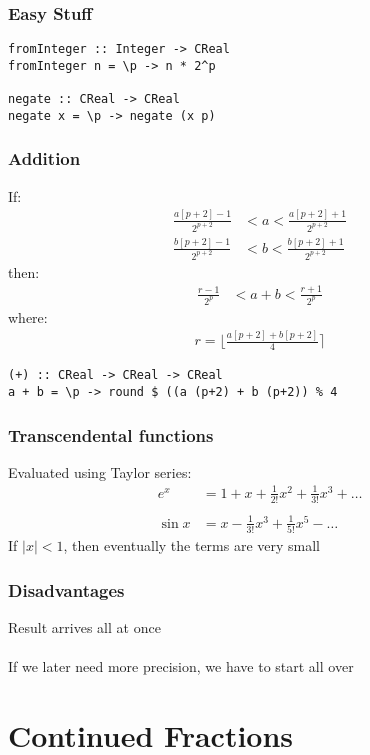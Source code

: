 \documentclass[11pt]{beamer}
\begin{document}
\begin{frame}[fragile]
\frametitle{Easy Stuff}
\begin{verbatim}
fromInteger :: Integer -> CReal
fromInteger n = \p -> n * 2^p

negate :: CReal -> CReal
negate x = \p -> negate (x p)
\end{verbatim}
\end{frame}

\begin{frame}[fragile]
\frametitle{Addition}
If:
\begin{align*}
\frac{a[p+2] - 1}{2^{p+2}} &< a < \frac{a[p+2] + 1}{2^{p+2}} \\
\frac{b[p+2] - 1}{2^{p+2}} &< b < \frac{b[p+2] + 1}{2^{p+2}}
\end{align*}
then:
\begin{align*}
\frac{r - 1}{2^p} & < a + b < \frac{r + 1}{2^p}
\end{align*}
where:
\begin{align*}
r = \lfloor \frac{a[p+2]+b[p+2]}{4} \rceil
\end{align*}
\begin{verbatim}
(+) :: CReal -> CReal -> CReal
a + b = \p -> round $ ((a (p+2) + b (p+2)) % 4
\end{verbatim}
\end{frame}

\begin{frame}[fragile]
\frametitle{Transcendental functions}
Evaluated using Taylor series:
\begin{align*}
e^x &= 1 + x + \frac{1}{2!}x^2 + \frac{1}{3!}x^3 + \dots \\
~\\
\sin x &= x - \frac{1}{3!}x^3 + \frac{1}{5!}x^5 - \dots
\end{align*}
If $\vert x \vert < 1$, then eventually the terms are very small
\end{frame}

\begin{frame}
\frametitle{Disadvantages}
Result arrives all at once
\\~\\
If we later need more precision, we have to start all over
\end{frame}

\section{Continued Fractions}
\end{document}
